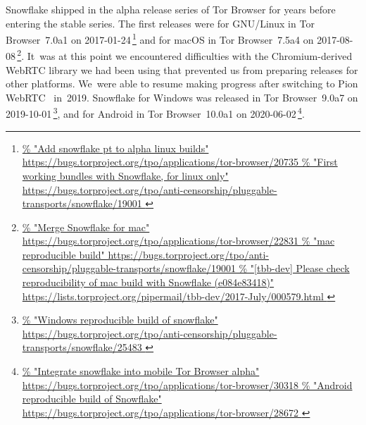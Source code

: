 \documentclass[letterpaper,twocolumn]{article}
\newlength{\urlfootnotesize}
\newcommand{\urlfootnote}[1]{\footnote{
\raggedright\hangindent\footnotemargin%
\fontsize{\urlfootnotesize}{\urlfootnotesize}\selectfont%
\url{#1}
}}
\begin{document}
Snowflake shipped in the alpha release series of Tor Browser
for years before entering the stable series.
The first releases were
for GNU/Linux
in Tor Browser~7.0a1 on \mbox{2017-01-24}\,\urlfootnote{
https://bugs.torproject.org/tpo/applications/tor-browser/20735
}
and for macOS
in Tor Browser~7.5a4 on \mbox{2017-08-08}\,\urlfootnote{
https://bugs.torproject.org/tpo/applications/tor-browser/22831
}.
It~was at this point we encountered difficulties with
the Chromium-derived WebRTC library we had been using
that prevented us from preparing releases for other platforms.
We~were able to resume making progress after switching to
Pion WebRTC~\cite{pion-webrtc} in~2019.
Snowflake for Windows was released
in Tor Browser~9.0a7 on \mbox{2019-10-01}\,\urlfootnote{
https://bugs.torproject.org/tpo/anti-censorship/pluggable-transports/snowflake/25483
},
and for Android in
Tor Browser~10.0a1 on \mbox{2020-06-02}\,\urlfootnote{
https://bugs.torproject.org/tpo/applications/tor-browser/30318
}.
\end{document}

